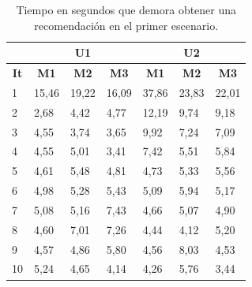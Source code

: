 \begin{table}[H]
  \begin{center}
    \caption{Tiempo en segundos que demora obtener una recomendación en el primer escenario.}
    \label{tab:res-tab01}
    \begin{tabular}{|l|l|l|l|l|l|l|}
      \hline
       & \multicolumn{3}{c|}{\textbf{U1}} & \multicolumn{3}{c|}{\textbf{U2}} \\ \hline
      \multicolumn{1}{|c|}{\textbf{It}} & \multicolumn{1}{c|}{\textbf{M1}} & \multicolumn{1}{c|}{\textbf{M2}} & \multicolumn{1}{c|}{\textbf{M3}} & \multicolumn{1}{c|}{\textbf{M1}} & \multicolumn{1}{c|}{\textbf{M2}} & \multicolumn{1}{c|}{\textbf{M3}} \\ \hline
      1 & 15,46 & 19,22 & 16,09 & 37,86 & 23,83 & 22,01 \\ \hline
      2 & 2,68 & 4,42 & 4,77 & 12,19 & 9,74 & 9,18 \\ \hline
      3 & 4,55 & 3,74 & 3,65 & 9,92 & 7,24 & 7,09 \\ \hline
      4 & 4,55 & 5,01 & 3,41 & 7,42 & 5,51 & 5,84 \\ \hline
      5 & 4,61 & 5,48 & 4,81 & 4,73 & 5,33 & 5,56 \\ \hline
      6 & 4,98 & 5,28 & 5,43 & 5,09 & 5,94 & 5,17 \\ \hline
      7 & 5,08 & 5,16 & 7,43 & 4,66 & 5,07 & 4,90 \\ \hline
      8 & 4,60 & 7,01 & 7,26 & 4,44 & 4,12 & 5,20 \\ \hline
      9 & 4,57 & 4,86 & 5,80 & 4,56 & 8,03 & 4,53 \\ \hline
      10 & 5,24 & 4,65 & 4,14 & 4,26 & 5,76 & 3,44 \\ \hline
    \end{tabular}
  \end{center}
\end{table}

